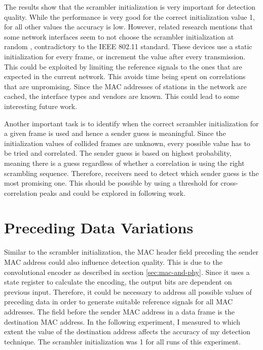 The results show that the scrambler initialization is very important for detection quality. While the performance is very good for the correct initialization value 1, for all other values the accuracy is low. However, related research mentions that some network interfaces seem to not choose the scrambler initialization at random \cite{noubir2016}, contradictory to the IEEE 802.11 standard. These devices use a static initialization for every frame, or increment the value after every transmission. This could be exploited by limiting the reference signals to the ones that are expected in the current network. This avoids time being spent on correlations that are unpromising. Since the \gls{MAC} addresses of stations in the network are cached, the interface types and vendors are known. This could lead to some interesting future work.

Another important task is to identify when the correct scrambler initialization for a given frame is used and hence a sender guess is meaningful. Since the initialization values of collided frames are unknown, every possible value has to be tried and correlated. The sender guess is based on highest probability, meaning there is a guess regardless of whether a correlation is using the right scrambling sequence. Therefore, receivers need to detect which sender guess is the most promising one. This should be possible by using a threshold for cross-correlation peaks and could be explored in following work.



\section{Preceding Data Variations}\label{sec:ex-destination}

Similar to the scrambler initialization, the \gls{MAC} header field preceding the sender \gls{MAC} address could also influence detection quality. This is due to the convolutional encoder as described in section \ref{sec:mac-and-phy}. Since it uses a state register to calculate the encoding, the output bits are dependent on previous input. Therefore, it could be necessary to address all possible values of preceding data in order to generate suitable reference signals for all MAC addresses. The field before the sender \gls{MAC} address in a data frame is the destination \gls{MAC} address. In the following experiment, I measured to which extent the value of the destination address affects the accuracy of my detection technique. The scrambler initialization was 1 for all runs of this experiment.\\

